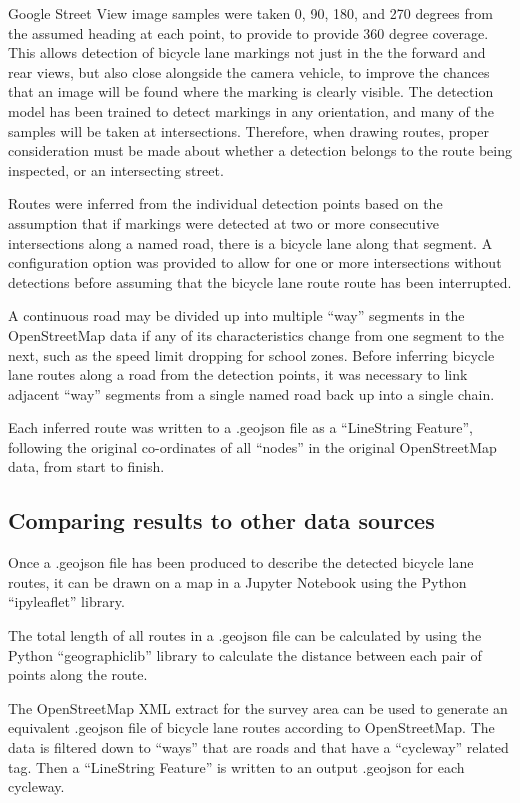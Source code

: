 \documentclass[11pt,twoside]{report}
\begin{document}
Google Street View image samples were taken 0, 90, 180, and 270 degrees from the assumed heading at each point, to provide to provide 360 degree coverage.  This allows detection of bicycle lane markings not just in the the forward and rear views, but also close alongside the camera vehicle, to improve the chances that an image will be found where the marking is clearly visible.  The detection model has been trained to detect markings in any orientation, and many of the samples will be taken at intersections.  Therefore, when drawing routes, proper consideration must be made about whether a detection belongs to the route being inspected, or an intersecting street.

Routes were inferred from the individual detection points based on the assumption that if markings were detected at two or more consecutive intersections along a named road, there is a bicycle lane along that segment.  A configuration option was provided to allow for one or more intersections without  detections before assuming that the bicycle lane route route has been interrupted.

A continuous road may be divided up into multiple ``way'' segments in the OpenStreetMap data if any of its characteristics change from one segment to the next, such as the speed limit dropping for school zones.  Before inferring bicycle lane routes along a road from the detection points, it was necessary to link adjacent ``way'' segments from a single named road back up into a single chain.

Each inferred route was written to a .geojson file as a ``LineString Feature'', following the original co-ordinates of all ``nodes'' in the original OpenStreetMap data, from start to finish.


\subsection{Comparing results to other data sources}

Once a .geojson file has been produced to describe the detected bicycle lane routes, it can be drawn on a map in a Jupyter Notebook using the Python ``ipyleaflet'' library.

The total length of all routes in a .geojson file can be calculated by using the Python ``geographiclib'' library to calculate the distance between each pair of points along the route.

The OpenStreetMap XML extract for the survey area can be used to generate an equivalent .geojson file of bicycle lane routes according to OpenStreetMap.  The data is filtered down to ``ways'' that are roads and that have a ``cycleway'' related tag.  Then a ``LineString Feature'' is written to an output .geojson for each cycleway.
\end{document}
